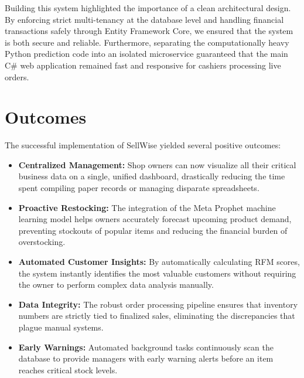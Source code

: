 \documentclass[12pt,a4paper]{report}
\begin{document}
Building this system highlighted the importance of a clean architectural design. By enforcing strict multi-tenancy at the database level and handling financial transactions safely through Entity Framework Core, we ensured that the system is both secure and reliable. Furthermore, separating the computationally heavy Python prediction code into an isolated microservice guaranteed that the main C\# web application remained fast and responsive for cashiers processing live orders. 

\section{Outcomes}
The successful implementation of SellWise yielded several positive outcomes:
\begin{itemize}
    \item \textbf{Centralized Management:} Shop owners can now visualize all their critical business data on a single, unified dashboard, drastically reducing the time spent compiling paper records or managing disparate spreadsheets.
    \item \textbf{Proactive Restocking:} The integration of the Meta Prophet machine learning model helps owners accurately forecast upcoming product demand, preventing stockouts of popular items and reducing the financial burden of overstocking.
    \item \textbf{Automated Customer Insights:} By automatically calculating RFM scores, the system instantly identifies the most valuable customers without requiring the owner to perform complex data analysis manually.
    \item \textbf{Data Integrity:} The robust order processing pipeline ensures that inventory numbers are strictly tied to finalized sales, eliminating the discrepancies that plague manual systems.
    \item \textbf{Early Warnings:} Automated background tasks continuously scan the database to provide managers with early warning alerts before an item reaches critical stock levels.
\end{itemize}
\end{document}
